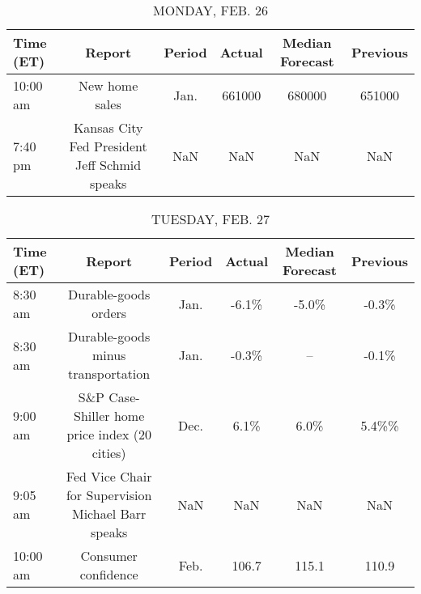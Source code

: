 \documentclass{article}%
\begin{document}
%
\normalsize%


\begin{table}[htbp]%
\caption{MONDAY, FEB. 26}%
\centering%
\begin{adjustbox}{width=1\textwidth}%
\begin{tabular}{lccccc}
\toprule
Time (ET) &                                       Report & Period & Actual & Median Forecast & Previous \\
\midrule
 10:00 am &                               New home sales &   Jan. & 661000 &          680000 &   651000 \\
  7:40 pm & Kansas City Fed President Jeff Schmid speaks &    NaN &    NaN &             NaN &      NaN \\
\bottomrule
\end{tabular}
%
\end{adjustbox}%
\end{table}

%


\begin{table}[htbp]%
\caption{TUESDAY, FEB. 27}%
\centering%
\begin{adjustbox}{width=1\textwidth}%
\begin{tabular}{lccccc}
\toprule
Time (ET) &                                             Report & Period & Actual & Median Forecast & Previous \\
\midrule
  8:30 am &                               Durable-goods orders &   Jan. &  -6.1\% &           -5.0\% &    -0.3\% \\
  8:30 am &                 Durable-goods minus transportation &   Jan. &  -0.3\% &              -- &    -0.1\% \\
  9:00 am &      S\&P Case-Shiller home price index (20 cities) &   Dec. &   6.1\% &            6.0\% &    5.4\%\% \\
  9:05 am & Fed Vice Chair for Supervision Michael Barr speaks &    NaN &    NaN &             NaN &      NaN \\
 10:00 am &                                Consumer confidence &   Feb. &  106.7 &           115.1 &    110.9 \\
\bottomrule
\end{tabular}
%
\end{adjustbox}%
\end{table}

%
\end{document}
